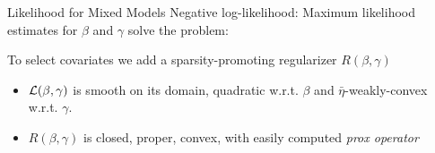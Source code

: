 \documentclass[8pt]{beamer}
\begin{document}
\begin{frame}{Likelihood for Mixed Models}
Negative log-likelihood:
Maximum likelihood estimates for $\beta$ and $\gamma$ solve the problem:

To select covariates we add a sparsity-promoting regularizer $R(\beta, \gamma)$

\begin{itemize}
	\item $\operatorname{\mathcal{L}}(\beta, \gamma)$ is smooth on its domain, quadratic w.r.t. $\beta$ and $\bar\eta$-weakly-convex w.r.t. $\gamma$.
	\item $R(\beta, \gamma)$ is closed, proper, convex, with easily computed \textit{prox operator}
\end{itemize}

\end{frame}
\end{document}
